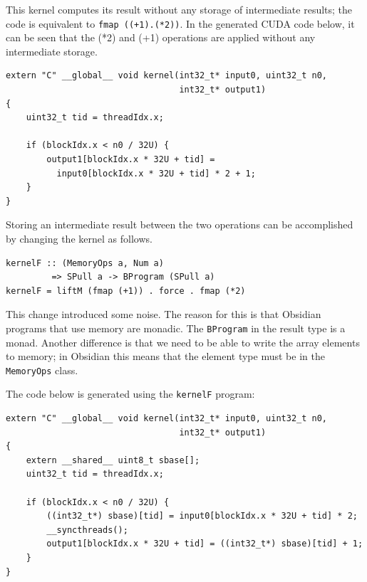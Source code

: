 \documentclass[a4paper]{book}
\begin{document}
\noindent This kernel computes its result without any storage of intermediate results;
the code is equivalent to \verb!fmap ((+1).(*2))!. 
In the generated CUDA code below, it can be seen that the (*2) and (+1) operations 
are applied without any intermediate storage. 

\begin{small}
\begin{Verbatim}[samepage=true]
extern "C" __global__ void kernel(int32_t* input0, uint32_t n0,
                                  int32_t* output1)
{
    uint32_t tid = threadIdx.x;
    
    if (blockIdx.x < n0 / 32U) {
        output1[blockIdx.x * 32U + tid] = 
          input0[blockIdx.x * 32U + tid] * 2 + 1;
    }
}
\end{Verbatim}
\end{small}

Storing an intermediate result between the two operations can be accomplished by 
changing the kernel as follows. 

\begin{small}
\begin{Verbatim}[samepage=true]
kernelF :: (MemoryOps a, Num a)
         => SPull a -> BProgram (SPull a)
kernelF = liftM (fmap (+1)) . force . fmap (*2)
\end{Verbatim} 
\end{small} 

This change introduced some noise. The reason for this is that Obsidian programs that 
use memory are monadic. The {\tt BProgram} in the result type is a monad. Another difference 
is that we need to be able to write the array elements to memory; in Obsidian this means 
that the element type must be in the {\tt MemoryOps} class. 

The code below is generated using the {\tt kernelF} program: 

\begin{small} 
\begin{Verbatim}[samepage=true]
extern "C" __global__ void kernel(int32_t* input0, uint32_t n0,
                                  int32_t* output1)
{
    extern __shared__ uint8_t sbase[];
    uint32_t tid = threadIdx.x;
    
    if (blockIdx.x < n0 / 32U) {
        ((int32_t*) sbase)[tid] = input0[blockIdx.x * 32U + tid] * 2;
        __syncthreads();
        output1[blockIdx.x * 32U + tid] = ((int32_t*) sbase)[tid] + 1;
    }
}
\end{Verbatim}
\end{small} 
\end{document}
